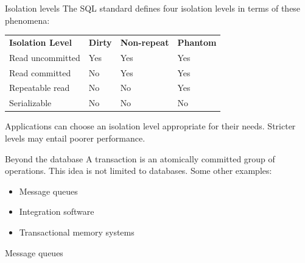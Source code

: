 \documentclass[svgnames]{beamer}
\begin{document}
\begin{frame}{Isolation levels}
    The SQL standard defines four isolation levels in terms of these
    phenomena: \\
    \vspace{.5cm}
    \begin{tabular}{llll}
        \textbf{Isolation Level} & \textbf{Dirty} &
        \textbf{Non-repeat} & \textbf{Phantom} \\
        Read uncommitted & Yes & Yes & Yes \\
        Read committed & No & Yes & Yes \\
        Repeatable read & No & No & Yes \\
        Serializable & No & No & No
    \end{tabular}
    \vspace{10pt} \par
    Applications can choose an isolation level appropriate for their needs.
    Stricter levels may entail poorer performance.
\end{frame}

\begin{frame}{Beyond the database}
    A transaction is an atomically committed group of operations. This idea is
    not limited to databases. Some other examples: \\

    \begin{itemize}
        \item Message queues
        \item Integration software
        \item Transactional memory systems
    \end{itemize}
\end{frame}

\begin{frame}{Message queues}
\end{frame}


\end{document}
